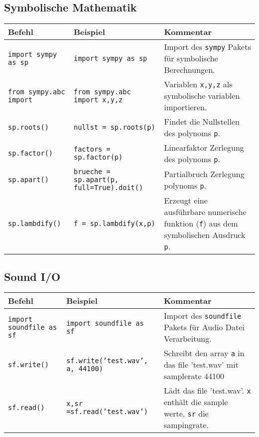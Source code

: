 \subsection*{Symbolische Mathematik}
\begin{table}[H]
    \centering
    \begin{tabular}{|p{3cm}|p{6cm}|p{6cm}|}
        \hline
    \textbf{Befehl} & \textbf{Beispiel} & \textbf{Kommentar} \\ \hline
    
    \texttt{import sympy as sp} & \texttt{import sympy as sp} & Import des \texttt{sympy} Pakets für symbolische Berechnungen. \\ \hline
    \texttt{from sympy.abc import} & \texttt{from sympy.abc import x,y,z} & Variablen \texttt{x,y,z} als symbolische variablen importieren. \\ \hline
    \texttt{sp.roots()} & \texttt{nullst = sp.roots(p)} & Findet die Nullstellen des polynoms \texttt{p}. \\ \hline
    \texttt{sp.factor()} & \texttt{factors = sp.factor(p)} & Linearfaktor Zerlegung des polynoms \texttt{p}. \\ \hline
    \texttt{sp.apart()} & \texttt{brueche = sp.apart(p, full=True).doit()} & Partialbruch Zerlegung polynoms \texttt{p}. \\ \hline
    \texttt{sp.lambdify()} & \texttt{f  = sp.lambdify(x,p)} & Erzeugt eine ausführbare numerische funktion (\texttt{f}) aus dem symbolischen Ausdruck \texttt{p}. \\ \hline

    \end{tabular}
\end{table}

\subsection*{Sound I/O}
\begin{table}[H]
    \centering
    \begin{tabular}{|p{3cm}|p{6cm}|p{6cm}|}
        \hline
    \textbf{Befehl} & \textbf{Beispiel} & \textbf{Kommentar} \\ \hline
    
    \texttt{import soundfile as sf} & \texttt{import soundfile as sf} & Import des \texttt{soundfile} Pakets für Audio Datei Verarbeitung. \\ \hline
    \texttt{sf.write()} & \texttt{sf.write('test.wav', a, 44100)} & Schreibt den array \texttt{a} in das file 'test.wav' mit samplerate 44100 \\ \hline
    \texttt{sf.read()} & \texttt{x,sr =sf.read('test.wav')} & Lädt das file 'test.wav'. \texttt{x} enthält die sample werte, \texttt{sr} die sampingrate. \\ \hline

    \end{tabular}
\end{table}
